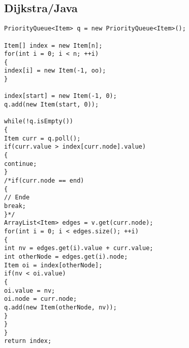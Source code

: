 \subsection{Dijkstra/Java}
\begin{lstlisting}
PriorityQueue<Item> q = new PriorityQueue<Item>();

Item[] index = new Item[n];
for(int i = 0; i < n; ++i)
{
index[i] = new Item(-1, oo);
}

index[start] = new Item(-1, 0);
q.add(new Item(start, 0));

while(!q.isEmpty())
{
Item curr = q.poll();
if(curr.value > index[curr.node].value)
{
continue;
}
/*if(curr.node == end)
{
// Ende
break;
}*/
ArrayList<Item> edges = v.get(curr.node);
for(int i = 0; i < edges.size(); ++i)
{
int nv = edges.get(i).value + curr.value;
int otherNode = edges.get(i).node;
Item oi = index[otherNode];
if(nv < oi.value)
{
oi.value = nv;
oi.node = curr.node;
q.add(new Item(otherNode, nv));
}
}
}
return index;
\end{lstlisting}
